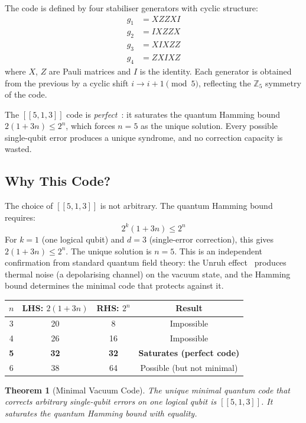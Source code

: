 \documentclass[11pt,a4paper]{article}
\newtheorem{theorem}{Theorem}[section]
\theoremstyle{definition}
\begin{document}
The code is defined by four stabiliser generators with cyclic structure:
\begin{align}
g_1 &= X Z Z X I \\ 
g_2 &= I X Z Z X \\
g_3 &= X I X Z Z \\
g_4 &= Z X I X Z
\label{eq:stabilisers}
\end{align}
where $X$, $Z$ are Pauli matrices and $I$ is the identity. Each generator is obtained from the previous by a cyclic shift $i \to i+1 \pmod{5}$, reflecting the $\mathbb{Z}_5$ symmetry of the code.

The $[[5,1,3]]$ code is \emph{perfect}~\cite{Laflamme1996}: it saturates the quantum Hamming bound $2(1 + 3n) \leq 2^n$, which forces $n = 5$ as the unique solution. Every possible single-qubit error produces a unique syndrome, and no correction capacity is wasted.

\subsection{Why This Code?}

The choice of $[[5,1,3]]$ is not arbitrary. The quantum Hamming bound requires:
\begin{equation}
2^k(1 + 3n) \leq 2^n
\label{eq:hamming}
\end{equation}
For $k = 1$ (one logical qubit) and $d = 3$ (single-error correction), this gives $2(1 + 3n) \leq 2^n$. The unique solution is $n = 5$. This is an independent confirmation from standard quantum field theory: the Unruh effect~\cite{Unruh1976}  produces thermal noise (a depolarising channel) on the vacuum state, and the Hamming bound determines the minimal code that protects against it.

\begin{center}
\begin{tabular}{cccc}
\toprule
$n$ & LHS: $2(1+3n)$ & RHS: $2^n$ & Result \\
\midrule
3 & 20 & 8 & Impossible \\
4 & 26 & 16 & Impossible \\
\textbf{5} & \textbf{32} & \textbf{32} & \textbf{Saturates (perfect code)} \\
6 & 38 & 64 & Possible (but not minimal) \\
\bottomrule
\end{tabular}
\end{center}

\begin{theorem}[Minimal Vacuum Code]
The unique minimal quantum code that corrects arbitrary single-qubit errors on one logical qubit is $[[5,1,3]]$. It saturates the quantum Hamming bound with equality.
\end{theorem}
\end{document}
